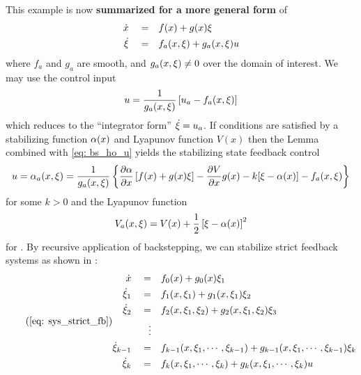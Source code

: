 \documentclass[12pt]{ucthesis}
\begin{document}
This example is now \textbf{summarized for a more general form} of 
	\begin{subequations} \label{eq: bs_ho_sys}
		\begin{align} 
			\label{eq: bs_ho_sysa} \dot{x} 	\quad =& \quad f(x)+g(x)\xi \\
			\label{eq: bs_ho_sysb} \dot{\xi} \quad =& \quad f_a(x,\xi)+g_a(x,\xi)u
		\end{align}
	\end{subequations}
where $f_a$ and $g_a$ are smooth, and $g_a(x,\xi) \neq 0$ over the domain of interest. We may use the control input 
	\begin{equation} \label{eq: bs_ho_u}
		u = \frac{1}{g_a(x,\xi)}\left[ u_a -  f_a(x,\xi) \right] 
	\end{equation}
which reduces  to the ``integrator form'' $\dot{\xi} = u_a$. If  conditions are satisfied by a stabilizing function $\alpha(x)$ and Lyapunov function $V(x)$ then the Lemma combined with \autoref{eq: bs_ho_u} yields the stabilizing state feedback control
	\begin{equation} \label{eq: bs_ho_stab}
		u = \alpha_a(x,\xi) = \frac{1}{g_a(x,\xi)} \left\lbrace  \frac{\partial\alpha}{\partial x}\left[ f(x)+g(x)\xi \right] - \frac{\partial V}{\partial x}g(x) - k[\xi - \alpha(x)] - f_a(x,\xi) \right\rbrace
	\end{equation}
for some $k > 0$ and the Lyapunov function
	\begin{equation} \label{eq: bs_ho_V}
		V_a(x,\xi) = V(x) + \frac{1}{2}\left[ \xi - \alpha(x) \right]^2 
	\end{equation}
for . By recursive application of backstepping, we can stabilize strict feedback systems as shown in :
\begin{equation} \tag{\ref{eq: sys_strict_fb}}
	\begin{aligned}   %
		\dot{x} 	\quad =& \quad  f_0(x) + g_0(x)\virt_1   					\\
		\dot{\virt}_1 	\quad =& \quad  f_1(x,\virt_1) 			+ g_1(x,\virt_1)\virt_2  											\\
		\dot{\virt}_2 	\quad =& \quad 	f_2(x,\virt_1,\virt_2) 	+ g_2(x,\virt_1,\virt_2)\virt_3 									\\
						\quad \vdots 											\\
		\dot{\virt}_{k-1}\quad =& \quad  f_{k-1}(x,\virt_1,\cdots,\virt_{k-1}) 	+ g_{k-1}(x,\virt_1,\cdots,\virt_{k-1})\virt_k 		\\
		\dot{\virt}_{k} \quad =& \quad  f_{k}(x,\virt_1,\cdots,\virt_{k}) 		+ g_{k}(x,\virt_1,\cdots,\virt_{k})u
	\end{aligned}
\end{equation}
\end{document}
